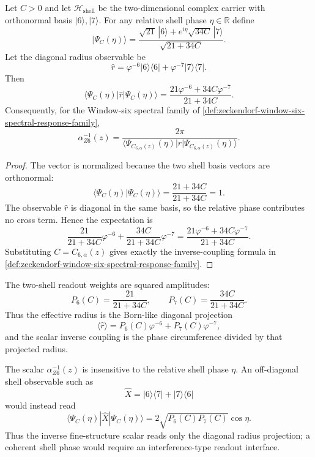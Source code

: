 \begin{theorem}
\label{thm:zeckendorf-born-like-two-shell-radius-projection}
Let $C>0$ and let $\mathcal{H}_{\mathrm{shell}}$ be the two-dimensional
complex carrier with orthonormal basis $|6\rangle,|7\rangle$. For any
relative shell phase $\eta\in\mathbb{R}$ define
$$
  |\Psi_C(\eta)\rangle
  =
  \frac{
    \sqrt{21}\,|6\rangle
    +
    e^{i\eta}\sqrt{34C}\,|7\rangle
  }{
    \sqrt{21+34C}
  }.
$$
Let the diagonal radius observable be
$$
  \widehat r
  =
  \varphi^{-6}|6\rangle\langle 6|
  +
  \varphi^{-7}|7\rangle\langle 7|.
$$
Then
$$
  \langle\Psi_C(\eta)|\widehat r|\Psi_C(\eta)\rangle
  =
  \frac{
    21\varphi^{-6}+34C\varphi^{-7}
  }{
    21+34C
  }.
$$
Consequently, for the Window-six spectral family of
\autoref{def:zeckendorf-window-six-spectral-response-family},
$$
  \alpha_{Z6}^{-1}(z)
  =
  \frac{
    2\pi
  }{
    \langle\Psi_{C_{6,\alpha}(z)}(\eta)|
    \widehat r|
    \Psi_{C_{6,\alpha}(z)}(\eta)\rangle
  }.
$$
\end{theorem}
\begin{proof}
The vector is normalized because the two shell basis vectors are
orthonormal:
$$
  \langle\Psi_C(\eta)|\Psi_C(\eta)\rangle
  =
  \frac{21+34C}{21+34C}
  =
  1.
$$
The observable $\widehat r$ is diagonal in the same basis, so the
relative phase contributes no cross term. Hence the expectation is
$$
  \frac{21}{21+34C}\varphi^{-6}
  +
  \frac{34C}{21+34C}\varphi^{-7}
  =
  \frac{
    21\varphi^{-6}+34C\varphi^{-7}
  }{
    21+34C
  }.
$$
Substituting $C=C_{6,\alpha}(z)$ gives exactly the inverse-coupling
formula in \autoref{def:zeckendorf-window-six-spectral-response-family}.
\end{proof}

\begin{corollary}
\label{cor:zeckendorf-born-like-shell-weights}
The two-shell readout weights are squared amplitudes:
$$
  P_6(C)=\frac{21}{21+34C},
  \qquad
  P_7(C)=\frac{34C}{21+34C}.
$$
Thus the effective radius is the Born-like diagonal projection
$$
  \langle\widehat r\rangle
  =
  P_6(C)\varphi^{-6}
  +
  P_7(C)\varphi^{-7},
$$
and the scalar inverse coupling is the phase circumference divided by
that projected radius.
\end{corollary}

\begin{corollary}
\label{cor:zeckendorf-diagonal-radius-phase-blindness}
The scalar $\alpha_{Z6}^{-1}(z)$ is insensitive to the relative shell
phase $\eta$. An off-diagonal shell observable such as
$$
  \widehat X
  =
  |6\rangle\langle 7|
  +
  |7\rangle\langle 6|
$$
would instead read
$$
  \langle\Psi_C(\eta)|\widehat X|\Psi_C(\eta)\rangle
  =
  2\sqrt{P_6(C)P_7(C)}\cos\eta.
$$
Thus the inverse fine-structure scalar reads only the diagonal
radius projection; a coherent shell phase would require an
interference-type readout interface.
\end{corollary}

